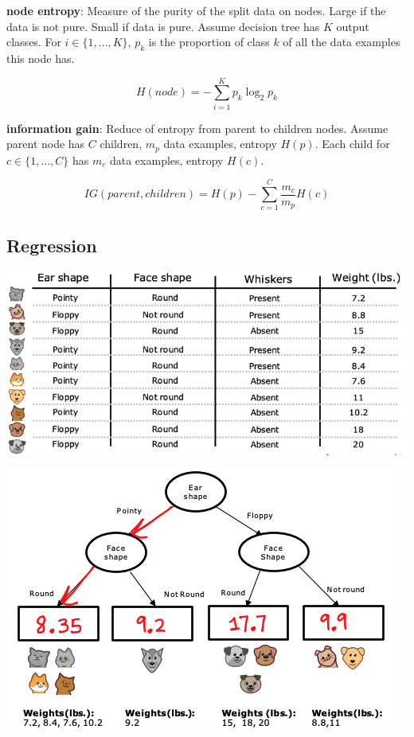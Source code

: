 \documentclass{article}
\begin{document}
\noindent \textbf{node entropy}: Measure of the purity of the split data on nodes. Large if the data is not pure. Small if data is pure. Assume decision tree has \(K\) output classes. For \(i \in \{1, \dots, K\}\), \(p_k\) is the proportion of class \(k\) of all the data examples this node has.

\[{H}(node) = -\sum _{i=1}^{K}p_{k}\log _{2}p_{k}\]

\noindent \textbf{information gain}: Reduce of entropy from parent to children nodes. Assume parent node has \(C\) children, \(m_{p}\) data examples, entropy \({H}(p)\). Each child for \(c \in \{1, \dots, C\}\) has \(m_{c}\) data examples, entropy \({H}(c)\).

\[{IG}(parent, children) = H(p) - \sum _{c=1}^{C}\frac{m_{c}}{m_{p}}{H}(c)\]

\subsection{Regression}

\begin{center}
\includegraphics[scale=0.4]{./images/decision_tree_regression_data.png}
\end{center}

\begin{center}
\includegraphics[scale=0.5]{./images/decision_tree_regression_process.png}
\end{center}
\end{document}
